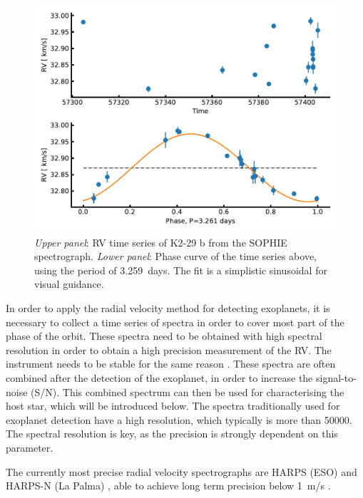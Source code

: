 \begin{figure}[htpb!]
    \centering
    \includegraphics[width=1.0\linewidth]{figures/RVmethod.pdf}
    \caption{\emph{Upper panel}: RV time series of K2-29 b from the SOPHIE spectrograph.
             \emph{Lower panel}: Phase curve of the time series above, using the period of
             \SI{3.259}{days}. The fit is a simplistic sinusoidal for visual guidance.}
    \label{fig:rvmethod}
\end{figure}

In order to apply the radial velocity method for detecting exoplanets, it is necessary to collect a
time series of spectra in order to cover most part of the phase of the orbit. These spectra need to
be obtained with high spectral resolution in order to obtain a high precision measurement of the RV.
The instrument needs to be stable for the same reason \citep[see e.g.][]{Bouchy2001}. These spectra
are often combined after the detection of the exoplanet, in order to increase the signal-to-noise
(S/N). This combined spectrum can then be used for characterising the host star, which will be
introduced below. The spectra traditionally used for exoplanet detection have a high resolution,
which typically is more than \num{50000}. The spectral resolution is key, as the precision is
strongly dependent on this parameter.

The currently most precise radial velocity spectrographs are HARPS (ESO) \citep{HARPS} and HARPS-N
(La Palma) \citep{HARPSN}, able to achieve long term precision below \SI{1}{m/s} \citep[see
e.g.][]{Pepe2013}.

